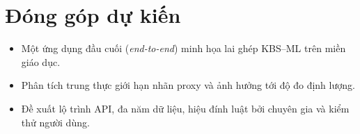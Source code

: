 \section{Đóng góp dự kiến}
\begin{itemize}[leftmargin=*]
  \item Một ứng dụng đầu cuối (\textit{end-to-end}) minh họa lai ghép KBS--ML trên miền giáo dục.
  \item Phân tích trung thực giới hạn nhãn proxy và ảnh hưởng tới độ đo định lượng.
  \item Đề xuất lộ trình API, đa năm dữ liệu, hiệu đính luật bởi chuyên gia và kiểm thử người dùng.
\end{itemize}
